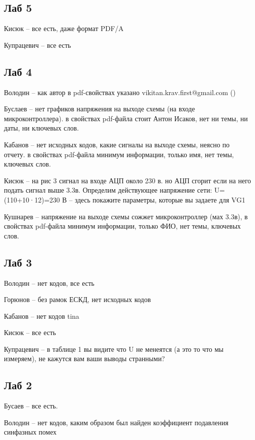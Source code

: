 \documentclass[a4paper,11pt]{article}
\begin{document}
\newpage
{}
\recalctypearea

\subsection*{Лаб 5}
Кисюк -- все есть, даже формат PDF/A

Купрацевич -- все есть
\subsection*{Лаб 4}

Володин --  как автор в pdf-свойствах указано vikitan.krav.first@gmail.com ()

Буслаев -- нет графиков напряжения на выходе схемы (на входе микроконтроллера). в свойствах pdf-файла стоит Антон Исаков,
нет ни темы, ни даты, ни ключевых слов.

Кабанов -- нет исходных кодов, какие сигналы на выходе схемы, неясно по отчету.  в свойствах pdf-файла минимум информации,
только имя, нет темы, ключевых слов.

Кисюк -- на рис 3 сигнал на входе АЦП около 230 в. но АЦП сгорит если на него подать сигнал выше 3.3в.  Определим действующее напряжение сети:
U=(110+10·12)=230 В  -- здесь покажите параметры, которые вы задаете для VG1

Кушнарев -- напряжение на выходе схемы сожжет микроконтроллер (мах 3.3в), в свойствах pdf-файла минимум информации,
только ФИО, нет темы, ключевых слов.

\newpage
\subsection*{Лаб 3}

Володин -- нет кодов, все есть

Горюнов -- без рамок ЕСКД, нет исходных кодов

Кабанов -- нет кодов tina

Кисюк -- все есть

Купрацевич -- в таблице 1 вы видите что U не менеятся (а это то что мы измеряем), не кажутся вам ваши выводы странными? 

\newpage
\subsection*{Лаб 2}

Бусаев -- все есть.

Володин -- нет кодов, каким образом был найден коэффициент подавления синфазных помех
\end{document}
